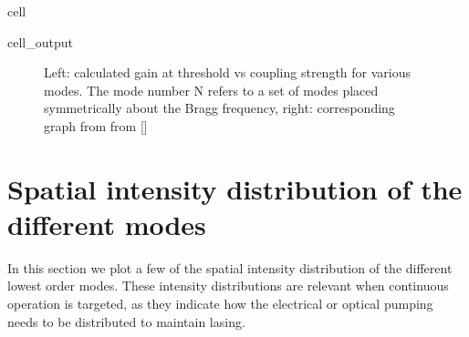 \documentclass[a4paper,10pt,english,openany,oneside]{jupyterBook}
\begin{document}
\begin{sphinxuseclass}{cell}\begin{sphinxVerbatimOutput}

\begin{sphinxuseclass}{cell_output}
\begin{figure}[htbp]
\centering
\capstart

\noindent{}
\caption{Left: calculated gain at threshold vs coupling strength for various modes. The mode number N refers to a set of modes placed symmetrically about the Bragg frequency, right: corresponding graph from from {[}{]}}\label{\detokenize{Kogelnik-Shank_Coupled-Wave-Theory_DFB-Lasers:kogelnik9c}}\end{figure}

\end{sphinxuseclass}\end{sphinxVerbatimOutput}

\end{sphinxuseclass}

\section{Spatial intensity distribution of the different modes}
\label{\detokenize{Kogelnik-Shank_Coupled-Wave-Theory_DFB-Lasers:spatial-intensity-distribution-of-the-different-modes}}
\sphinxAtStartPar
In this section we plot a few of the spatial intensity distribution of the different lowest order modes. These intensity distributions are relevant when continuous operation is targeted, as they indicate how the electrical or optical pumping needs to be distributed to maintain lasing.
\end{document}
